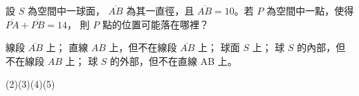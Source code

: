 \begin{QUESTIONS}
\begin{QUESTION}
\begin{ExamAnsRateInfo}{32}{51}{30}{15}
        \end{ExamAnsRateInfo}
        \begin{QBODY}
			設 $S$ 為空間中一球面， $\overline{AB}$ 為其一直徑，且 $\overline{AB} =10$。若 $ P$ 為空間中一點，使得 $\overline{PA} + \overline{PB} = 14$， 則 $P$ 點的位置可能落在哪裡？ 
			\begin{QOPS} 
				\QOP 線段 $\overline{AB}$ 上； 
				\QOP 直線 $AB$ 上，但不在線段 $\overline{AB}$ 上； 
				\QOP	球面 $S$ 上； 
				\QOP 球 $S$ 的內部，但不在線段 $AB$ 上； 
				\QOP 球 $S$ 的外部，但不在直線 AB 上。
			\end{QOPS}
        \end{QBODY}
        \begin{QFROMS}
        \end{QFROMS}
        \begin{QTAGS}\end{QTAGS}
        \begin{QANS}
            (2)(3)(4)(5)
        \end{QANS}
        \begin{QSOLLIST}
        \end{QSOLLIST}
        \begin{QEMPTYSPACE}
        \end{QEMPTYSPACE}
    \end{QUESTION}
\end{QUESTIONS}
